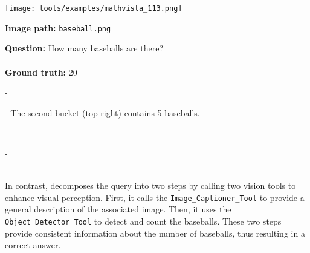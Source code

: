 
\begin{querybox}
    \begin{minipage}{0.3\linewidth}
        \texttt{[image: tools/examples/mathvista\_113.png]}
    \end{minipage}
    \hspace{5pt}
    \begin{minipage}{0.55\linewidth}
        \textbf{Image path:} \texttt{baseball.png}
        
        \textbf{Question:} How many baseballs are there?
        \\\\
        \textbf{Ground truth:} 20
    \end{minipage}
    \end{querybox}
    
    
    \begin{querybox}
    
    - 
    
    - The second bucket (top right) contains 5 baseballs.
    
    - 
    
    - 
    \\\\
    \end{querybox}
    
    In contrast, \model decomposes the query into two steps by calling two vision tools to enhance visual perception. First, it calls the \texttt{Image\_Captioner\_Tool} to provide a general description of the associated image. Then, it uses the \texttt{Object\_Detector\_Tool} to detect and count the baseballs. These two steps provide consistent information about the number of baseballs, thus resulting in a correct answer.
    
